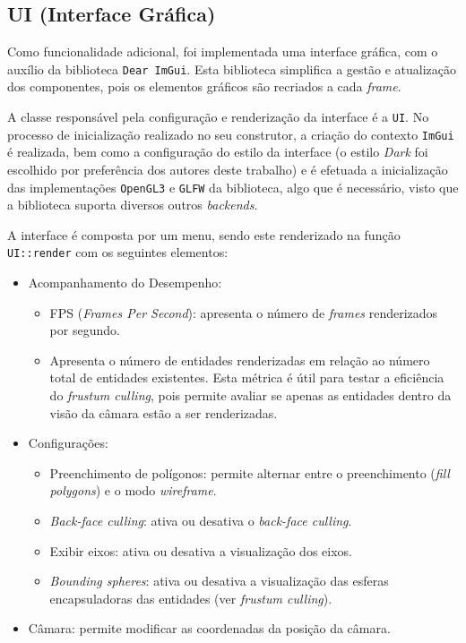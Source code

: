 \documentclass[12pt, a4paper]{article}
\begin{document}
\subsection{UI (Interface Gráfica)}

Como funcionalidade adicional, foi implementada uma interface gráfica, com o auxílio da biblioteca
\texttt{Dear ImGui}. \cite{dear-imgui} Esta biblioteca simplifica a gestão e atualização dos
componentes, pois os elementos gráficos são recriados a cada \textit{frame}.

A classe responsável pela configuração e renderização da interface é a \texttt{UI}. No processo de
inicialização realizado no seu construtor, a criação do contexto \texttt{ImGui} é realizada, bem
como a configuração do estilo da interface (o estilo \textit{Dark} foi escolhido por preferência dos
autores deste trabalho) e é efetuada a inicialização das implementações \texttt{OpenGL3} e
\texttt{GLFW} da biblioteca, algo que é necessário, visto que a biblioteca suporta diversos outros
\emph{backends}.

A interface é composta por um menu, sendo este renderizado na função \texttt{UI::render} com os
seguintes elementos:

\begin{itemize}
    \item Acompanhamento do Desempenho:
    \begin{itemize}
        \item FPS (\textit{Frames Per Second}): apresenta o número de \textit{frames}
            renderizados por segundo.
        \item Apresenta o número de entidades renderizadas em relação ao número total de entidades
            existentes. Esta métrica é útil para testar a eficiência do \textit{frustum culling},
            pois permite avaliar se apenas as entidades dentro da visão da câmara estão a ser
            renderizadas.
    \end{itemize}
    \item Configurações:
    \begin{itemize}
        \item Preenchimento de polígonos: permite alternar entre o preenchimento
            (\textit{fill polygons}) e o modo \textit{wireframe}.
        \item \textit{Back-face culling}: ativa ou desativa o \textit{back-face culling}.
        \item Exibir eixos: ativa ou desativa a visualização dos eixos.
        \item \textit{Bounding spheres}: ativa ou desativa a visualização das esferas encapsuladoras
            das entidades (ver \emph{frustum culling}).
    \end{itemize}
    \item Câmara: permite modificar as coordenadas da posição da câmara.
\end{itemize}
\end{document}
